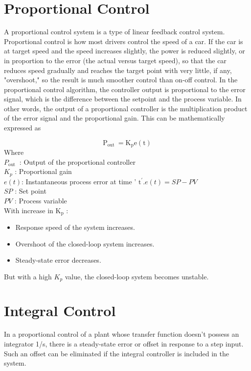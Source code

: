 \section{Proportional Control}

A proportional control system is a type of linear feedback control system. 
Proportional control is how most drivers control the speed of a car. If the car is at 
target speed and the speed increases slightly, the power is reduced slightly, or in 
proportion to the error (the actual versus target speed), so that the car reduces speed 
gradually and reaches the target point with very little, if any, "overshoot," so the result 
is much smoother control than on-off control. 
In the proportional control algorithm, the controller output is proportional to the error signal, which is the difference between the setpoint and the process variable. In other words, the output of a proportional controller is the multiplication product of the error signal and the proportional gain. This can be mathematically expressed as 

$$
\mathrm{P}_{\text {out }}=\mathrm{K}_{\mathrm{p}} \mathrm{e}(\mathrm{t})
$$
Where \\
$P_{\text {out }}$ : Output of the proportional controller \\
$K_{p}$ : Proportional gain \\
$e(t)$: Instantaneous process error at time ' $\mathrm{t}^{\prime} . e(t)=S P-P V$ \\
$S P$ : Set point \\
$P V$ : Process variable \\
With increase in $\mathrm{K}_{\mathrm{p}}$ : 
\begin{itemize}
	\item Response speed of the system increases.
	\item Overshoot of the closed-loop system increases. 
	\item Steady-state error decreases.
\end{itemize}
But with a high $K_p$ value, the closed-loop system becomes unstable.


\section{Integral Control}
 
In a proportional control of a plant whose transfer function doesn't possess an integrator 1/s, there is a steady-state error or offset in response to a step input. 
Such an offset can be eliminated if the integral controller is included in the system. 
 
